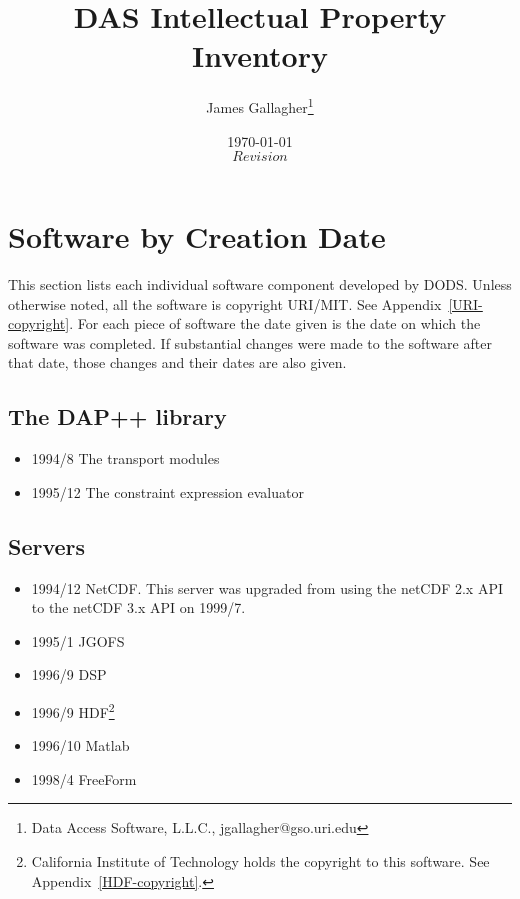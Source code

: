 \documentclass{article}
\begin{document}
\title{DAS Intellectual Property Inventory}
\author{James Gallagher\thanks{Data Access Software, {\sc L.L.C.}, 
    jgallagher@gso.uri.edu}}
\date{\today \\ $Revision$ }



\maketitle
\tableofcontents

\section{Software by Creation Date}

This section lists each individual software component developed by DODS.
Unless otherwise noted, all the software is copyright URI/MIT. See
Appendix~\ref{URI-copyright}. For each piece of software the date given is
the date on which the software was completed. If substantial changes were
made to the software after that date, those changes and their dates are also
given. 

 \subsection{The DAP++ library}

\begin{itemize}
\item 1994/8 The transport modules
\item 1995/12 The constraint expression evaluator
\end{itemize}

\subsection{Servers}

\begin{itemize}
\item 1994/12 NetCDF. This server was upgraded from using the netCDF
    2.x API to the netCDF 3.x API on 1999/7.
\item 1995/1 JGOFS
\item 1996/9 DSP
\item 1996/9 HDF\footnote{California Institute of Technology holds the
    copyright to this software. See Appendix~\ref{HDF-copyright}.}
\item 1996/10 Matlab
\item 1998/4 FreeForm
\end{itemize}
\end{document}
